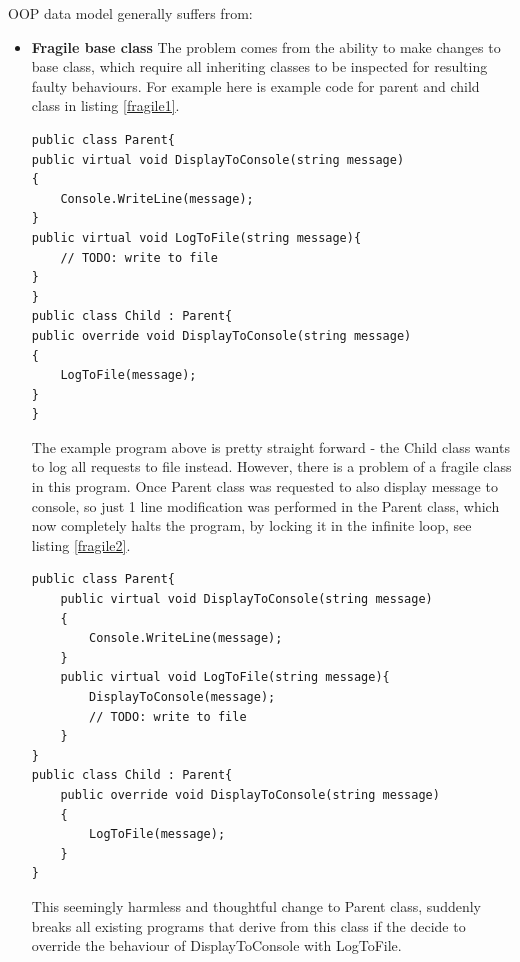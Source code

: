 \documentclass{article}
\begin{document}
OOP data model generally suffers from:
\begin{itemize}
    \item \textbf{Fragile base class} \newline
        The problem comes from the ability to make changes to base class, which require all inheriting classes to be inspected for resulting faulty behaviours.
        For example here is example code for parent and child class in listing \ref*{fragile1}.
        \begin{lstlisting}[frame=single, label=fragile1, caption=Fragile Parent Class]
public class Parent{
public virtual void DisplayToConsole(string message)
{
    Console.WriteLine(message);
}
public virtual void LogToFile(string message){
    // TODO: write to file
}
}
public class Child : Parent{
public override void DisplayToConsole(string message)
{
    LogToFile(message);
}
}
        \end{lstlisting}
        The example program above is pretty straight forward - the Child class wants to log all requests to file instead. However, there is a problem of a fragile class in this program. Once Parent class was requested to also display message to console, so just 1 line modification was performed in the Parent class, which now completely halts the program, by locking it in the infinite loop, see listing \ref*{fragile2}.
        \begin{lstlisting}[frame=single, label=fragile2, caption=Fragile Parent Class Backfired]
public class Parent{
    public virtual void DisplayToConsole(string message)
    {
        Console.WriteLine(message);
    }
    public virtual void LogToFile(string message){
        DisplayToConsole(message);
        // TODO: write to file
    }
}
public class Child : Parent{
    public override void DisplayToConsole(string message)
    {
        LogToFile(message);
    }
}
    \end{lstlisting}
        This seemingly harmless and thoughtful change to Parent class, suddenly breaks all existing programs that derive from this class if the decide to override the behaviour of DisplayToConsole with LogToFile.


\end{itemize}
\end{document}
